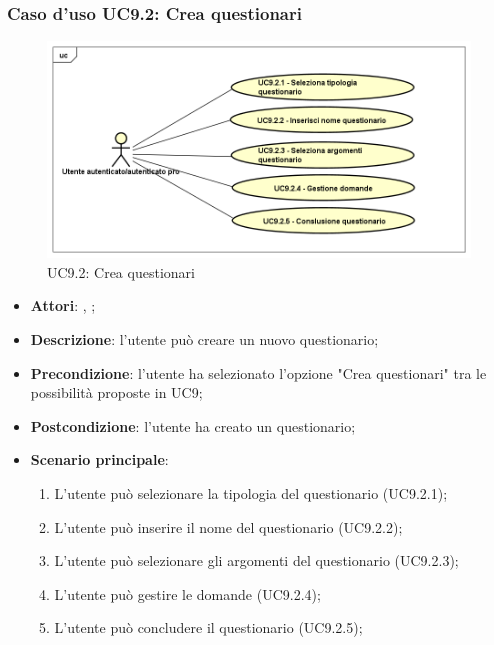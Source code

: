 	\subsubsection{Caso d'uso UC9.2: Crea questionari}
	\label{UC9.2}
	\begin{figure}[h]
		\centering
	\includegraphics[scale=0.5,keepaspectratio]{UML/UC9_2.png}
		\caption{UC9.2: Crea questionari}
	\end{figure}
	\FloatBarrier
	\begin{itemize}
		\item \textbf{Attori}: \uau, \uaupro;
		\item \textbf{Descrizione}: l'utente può creare un nuovo questionario; 
		\item \textbf{Precondizione}: l'utente ha selezionato l'opzione "Crea questionari" tra le possibilità proposte in UC9;
		\item \textbf{Postcondizione}: l'utente ha creato un questionario;
		\item \textbf{Scenario principale}:
			\begin{enumerate}
				\item L'utente può selezionare la tipologia del questionario (UC9.2.1);
				\item L'utente può inserire il nome del questionario (UC9.2.2);
				\item L'utente può selezionare gli argomenti del questionario (UC9.2.3);
				\item L'utente può gestire le domande (UC9.2.4);
				\item L'utente può concludere il questionario (UC9.2.5);
			\end{enumerate}
	\end{itemize}
	
